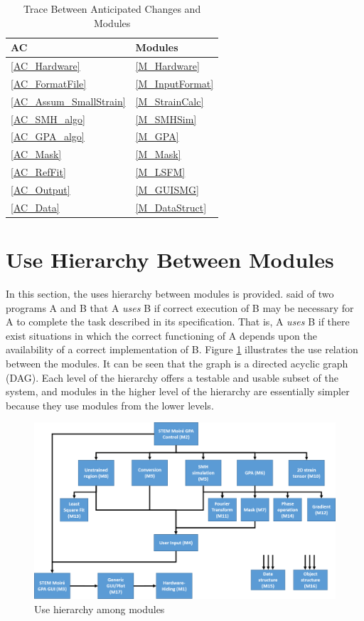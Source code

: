 \documentclass[12pt, titlepage]{article}
\begin{document}
\begin{table}[H]
\centering
\begin{tabular}{p{} p{}}
\toprule
\textbf{AC} & \textbf{Modules}\\
\midrule
\cref{AC_Hardware} & \cref{M_Hardware}\\
\cref{AC_FormatFile} & \cref{M_InputFormat}\\
\cref{AC_Assum_SmallStrain} & \cref{M_StrainCalc}\\
\cref{AC_SMH_algo} & \cref{M_SMHSim}\\
\cref{AC_GPA_algo} & \cref{M_GPA}\\
\cref{AC_Mask} & \cref{M_Mask}\\
\cref{AC_RefFit} & \cref{M_LSFM}\\
\cref{AC_Output} & \cref{M_GUISMG}\\
\cref{AC_Data} & \cref{M_DataStruct}\\
\bottomrule
\end{tabular}
\caption{Trace Between Anticipated Changes and Modules}
\label{TblACT}
\end{table}

\section{Use Hierarchy Between Modules} \label{SecUse}

In this section, the uses hierarchy between modules is
provided. \cite{Parnas1978} said of two programs A and B that A {\em uses} B if
correct execution of B may be necessary for A to complete the task described in
its specification. That is, A {\em uses} B if there exist situations in which
the correct functioning of A depends upon the availability of a correct
implementation of B.  Figure \ref{FigUH} illustrates the use relation between
the modules. It can be seen that the graph is a directed acyclic graph
(DAG). Each level of the hierarchy offers a testable and usable subset of the
system, and modules in the higher level of the hierarchy are essentially simpler
because they use modules from the lower levels.

\begin{figure}[H]
\centering
\includegraphics[width=\linewidth]{Figure_Hierarchy.png}
\caption{Use hierarchy among modules}
\label{FigUH}
\end{figure}
\end{document}
